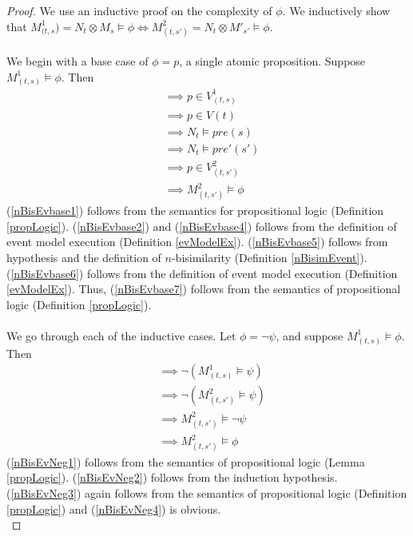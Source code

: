 \begin{proof}
We use an inductive proof on the complexity of $\phi$.
We inductively show that $M^1_{(t,s}) = N_t \otimes M_s \models \phi \iff M^2_{(t,s')} = N_t \otimes
M'_{s'} \models \phi$.\\
\\
We begin with a base case of $\phi = p$, a single atomic proposition.
Suppose $M^1_{(t,s)} \models \phi$.
Then
\begin{align}
	& \implies p \in V^1_{(t,s)} \label{nBisEvbase1} \\
	& \implies p \in V(t) \label{nBisEvbase2} \\
	& \implies N_t \models pre(s) \label{nBisEvbase4} \\
	& \implies N_t \models pre'(s') \label{nBisEvbase5} \\
	& \implies p \in V^2_{(t,s')} \label{nBisEvbase6}\\
	& \implies M^2_{(t,s')} \models \phi \label{nBisEvbase7}
\end{align}
(\ref{nBisEvbase1}) follows from the semantics for propositional logic (Definition \ref{propLogic}).
(\ref{nBisEvbase2}) and (\ref{nBisEvbase4}) follows from the definition of event model execution (Definition
\ref{evModelEx}).
(\ref{nBisEvbase5}) follows from hypothesis and the definition of $n$-bisimilarity (Definition
\ref{nBisimEvent}).
(\ref{nBisEvbase6}) follows from the definition of event model execution (Definition
\ref{evModelEx}).
Thus, (\ref{nBisEvbase7}) follows from the semantics of propositional logic (Definition
\ref{propLogic}).\\
\\
We go through each of the inductive cases.
Let $\phi = \neg \psi$, and suppose $M^1_{(t,s)} \models \phi$.
Then
\begin{align}
	& \implies \neg (M^1_{(t,s)} \models \psi) \label{nBisEvNeg1} \\
	& \implies \neg (M^2_{(t,s')} \models \psi) \label{nBisEvNeg2} \\
	& \implies M^2_{(t,s')} \models \neg \psi \label{nBisEvNeg3} \\
	& \implies M^2_{(t,s')} \models \phi \label{nBisEvNeg4}
\end{align}
(\ref{nBisEvNeg1}) follows from the semantics of propositional logic (Lemma \ref{propLogic}).
(\ref{nBisEvNeg2}) follows from the induction hypothesis.
(\ref{nBisEvNeg3}) again follows from the semantics of propositional logic (Definition
		\ref{propLogic}) and (\ref{nBisEvNeg4}) is obvious.\\

\end{proof}
